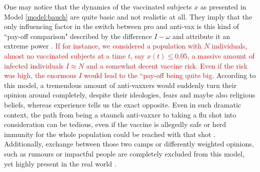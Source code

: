 \documentclass[12pt,a4paper,twoside]{article}
\begin{document}
One may notice that the dynamics of the vaccinated subjects $x$ as presented in Model \ref{model:bauch} are quite basic and not realistic at all. They imply that the only influencing factor in the switch between pro and anti-vax is this kind of ``pay-off comparison" described by the difference $I - \omega$ and attribute it an extreme power %
. \textcolor{red}{If for instance, we considered a population with $N$ individuals, almost no vaccinated subjects at a time $t$, say $x(t) \leq 0.05$, a massive amount of infected individuals $I \approx N$ and a somewhat decent vaccine risk. Even if the risk was high, the enormous $I$ would lead to the ``pay-off being quite big.} According to this model, a tremendous amount of anti-vaxxers would suddenly turn their opinion around completely, despite their ideologies, fears and maybe also religious beliefs, whereas experience tells us the exact opposite. Even in such dramatic context, the path from being a staunch anti-vaxxer to taking a flu shot into consideration can be tedious, even if the vaccine is allegedly safe or herd immunity for the whole population could be reached with that shot \cite{Meyer2004, Bednarz2020, Health2019}. Additionally, exchange between those two camps or differently weighted opinions, such as rumours or impactful people are completely excluded from this model, yet highly present in the real world \cite{Pincock2004}.
\end{document}
